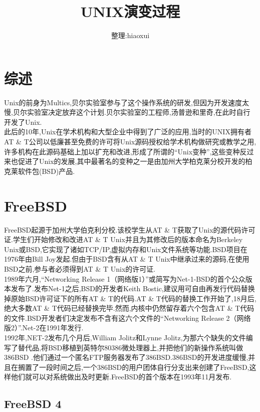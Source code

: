 \documentclass[a4paper,12pt,notitlepage]{article}
\begin{document}
\title{UNIX演变过程}
\author{整理:hiaoxui}
\maketitle

\section{综述}
	Unix的前身为Multics,贝尔实验室参与了这个操作系统的研发,但因为开发速度太慢,贝尔实验室决定放弃这个计划.贝尔实验室的工程师,汤普逊和里奇,在此时自行开发了Unix. \\

	此后的10年,Unix在学术机构和大型企业中得到了广泛的应用,当时的UNIX拥有者AT \& T公司以低廉甚至免费的许可将Unix源码授权给学术机构做研究或教学之用,许多机构在此源码基础上加以扩充和改进,形成了所谓的“Unix变种”,这些变种反过来也促进了Unix的发展,其中最著名的变种之一是由加州大学柏克莱分校开发的柏克莱软件包(BSD)产品. \\
	
\section{FreeBSD}

	FreeBSD起源于加州大学伯克利分校.该校学生从AT \& T获取了Unix的源代码许可证.学生们开始修改和改进AT \& T Unix并且为其修改后的版本命名为Berkeley Unix或BSD,它实现了诸如TCP/IP,虚拟内存和Unix文件系统等功能.BSD项目在1976年由Bill Joy发起.但由于BSD含有从AT \& T Unix中继承过来的源码,在使用BSD之前,参与者必须得到AT \& T Unix的许可证. \\

	1989年六月,“Networking Release 1（网络版1）”或简写为Net-1-BSD的首个公众版本发布了.发布Net-1之后,BSD的开发者Keith Bostic,建议用可自由再发行代码替换掉原始BSD许可证下的所有AT \& T的代码.AT \& T代码的替换工作开始了,18月后,绝大多数AT \& T代码已经替换完毕.然而,内核中仍然留存着六个包含AT \& T代码的文件.BSD开发者们决定发布不含有这六个文件的“Networking Release 2（网络版2）”.Net-2在1991年发行. \\
	
	1992年,NET-2发布几个月后,William Jolitz和Lynne Jolitz,为那六个缺失的文件编写了替代品,将BSD移植到英特尔80386微处理器上,并把他们的新操作系统叫做386BSD .他们通过一个匿名FTP服务器发布了386BSD.386BSD的开发进度缓慢,并且在搁置了一段时间之后,一个386BSD的用户团体自行分支出来创建了FreeBSD,这样他们就可以对系统做出及时更新.FreeBSD的首个版本在1993年11月发布. \\
	
\subsection{FreeBSD 4}
\end{document}
